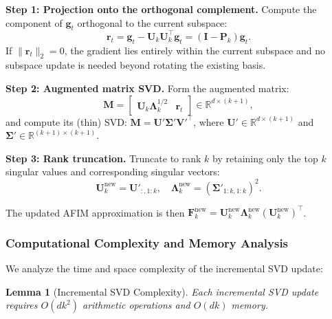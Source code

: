 \documentclass[preprint,12pt]{elsarticle}
\newtheorem{lemma}{Lemma}[section]
\begin{document}
\textbf{Step 1: Projection onto the orthogonal complement.} Compute the component of $\mathbf{g}_t$ orthogonal to the current subspace:
\begin{equation}
\label{eq:projection_complement}
\mathbf{r}_t = \mathbf{g}_t - \mathbf{U}_k \mathbf{U}_k^\top \mathbf{g}_t = (\mathbf{I} - \mathbf{P}_k) \mathbf{g}_t.
\end{equation}
If $\|\mathbf{r}_t\|_2 = 0$, the gradient lies entirely within the current subspace and no subspace update is needed beyond rotating the existing basis.

\textbf{Step 2: Augmented matrix SVD.} Form the augmented matrix:
\begin{equation}
\label{eq:augmented_matrix}
\mathbf{M} = \begin{bmatrix} \mathbf{U}_k \boldsymbol{\Lambda}_k^{1/2} & \mathbf{r}_t \end{bmatrix} \in \mathbb{R}^{d \times (k+1)},
\end{equation}
and compute its (thin) SVD: $\mathbf{M} = \mathbf{U}' \boldsymbol{\Sigma}' \mathbf{V}'^\top$, where $\mathbf{U}' \in \mathbb{R}^{d \times (k+1)}$ and $\boldsymbol{\Sigma}' \in \mathbb{R}^{(k+1) \times (k+1)}$.

\textbf{Step 3: Rank truncation.} Truncate to rank $k$ by retaining only the top $k$ singular values and corresponding singular vectors:
\begin{equation}
\label{eq:truncation}
\mathbf{U}_k^{\text{new}} = \mathbf{U}'_{:, 1:k}, \quad \boldsymbol{\Lambda}_k^{\text{new}} = (\boldsymbol{\Sigma}'_{1:k, 1:k})^2.
\end{equation}

The updated AFIM approximation is then $\mathbf{F}_k^{\text{new}} = \mathbf{U}_k^{\text{new}} \boldsymbol{\Lambda}_k^{\text{new}} (\mathbf{U}_k^{\text{new}})^\top$.

\subsubsection{Computational Complexity and Memory Analysis}
\label{sec:complexity}

We analyze the time and space complexity of the incremental SVD update:

\begin{lemma}[Incremental SVD Complexity]
\label{lem:incsvd_complexity}
Each incremental SVD update requires $O(dk^2)$ arithmetic operations and $O(dk)$ memory.
\end{lemma}
\end{document}
